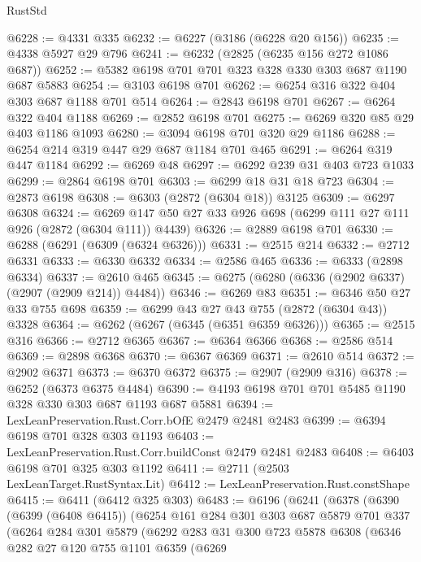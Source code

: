 \begin{lexlean}{RustStd}
\begin{coremodule}
{\begin{coremodule}
{{{{{{{{{{{{{{{{{{{{@6228 := @4331 @335
@6232 := @6227 (@3186 (@6228 @20 @156))
@6235 := @4338 @5927 @29 @796
@6241 := @6232 (@2825 (@6235 @156 @272 @1086 @687))
@6252 := @5382 @6198 @701 @701 @323 @328 @330 @303 @687 @1190 @687 @5883
@6254 := @3103 @6198 @701
@6262 := @6254 @316 @322 @404 @303 @687 @1188 @701 @514
@6264 := @2843 @6198 @701
@6267 := @6264 @322 @404 @1188
@6269 := @2852 @6198 @701
@6275 := @6269 @320 @85 @29 @403 @1186 @1093
@6280 := @3094 @6198 @701 @320 @29 @1186
@6288 := @6254 @214 @319 @447 @29 @687 @1184 @701 @465
@6291 := @6264 @319 @447 @1184
@6292 := @6269 @48
@6297 := @6292 @239 @31 @403 @723 @1033
@6299 := @2864 @6198 @701
@6303 := @6299 @18 @31 @18 @723
@6304 := @2873 @6198
@6308 := @6303 (@2872 (@6304 @18)) @3125
@6309 := @6297 @6308
@6324 := @6269 @147 @50 @27 @33 @926 @698 (@6299 @111 @27 @111 @926 (@2872 (@6304 @111)) @4439)
@6326 := @2889 @6198 @701
@6330 := @6288 (@6291 (@6309 (@6324 @6326)))
@6331 := @2515 @214
@6332 := @2712 @6331
@6333 := @6330 @6332
@6334 := @2586 @465
@6336 := @6333 (@2898 @6334)
@6337 := @2610 @465
@6345 := @6275 (@6280 (@6336 (@2902 @6337) (@2907 (@2909 @214)) @4484))
@6346 := @6269 @83
@6351 := @6346 @50 @27 @33 @755 @698
@6359 := @6299 @43 @27 @43 @755 (@2872 (@6304 @43)) @3328
@6364 := @6262 (@6267 (@6345 (@6351 @6359 @6326)))
@6365 := @2515 @316
@6366 := @2712 @6365
@6367 := @6364 @6366
@6368 := @2586 @514
@6369 := @2898 @6368
@6370 := @6367 @6369
@6371 := @2610 @514
@6372 := @2902 @6371
@6373 := @6370 @6372
@6375 := @2907 (@2909 @316)
@6378 := @6252 (@6373 @6375 @4484)
@6390 := @4193 @6198 @701 @701 @5485 @1190 @328 @330 @303 @687 @1193 @687 @5881
@6394 := LexLeanPreservation.Rust.Corr.bOfE @2479 @2481 @2483
@6399 := @6394 @6198 @701 @328 @303 @1193
@6403 := LexLeanPreservation.Rust.Corr.buildConst @2479 @2481 @2483
@6408 := @6403 @6198 @701 @325 @303 @1192
@6411 := @2711 (@2503 LexLeanTarget.RustSyntax.Lit)
@6412 := LexLeanPreservation.Rust.constShape
@6415 := @6411 (@6412 @325 @303)
@6483 := @6196
    (@6241
      (@6378
        (@6390
          (@6399 (@6408 @6415))
          (@6254
            @161
            @284
            @301
            @303
            @687
            @5879
            @701
            @337
            (@6264
              @284
              @301
              @5879
              (@6292
                @283
                @31
                @300
                @723
                @5878
                @6308
                (@6346
                  @282
                  @27
                  @120
                  @755
                  @1101
                  @6359
                  (@6269
}}}}}}}}}}}}}}}}}}}}
\end{coremodule}}
\end{coremodule}
\end{lexlean}
